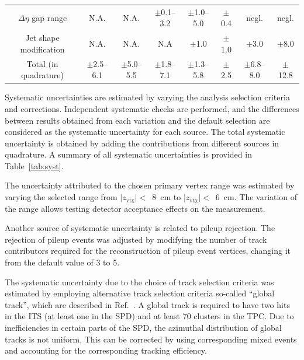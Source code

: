 \begin{table}[h!]
{\begin{tabular}{c|ccc|cccc}
$\Delta\eta$ gap range   	 & N.A.          & N.A.          & $\pm$0.1--3.2 & $\pm$1.0--5.0 & $\pm$0.4 & negl. & negl. \\ 
Jet shape modification   	 & N.A.          & N.A.          & N.A &  $\pm$1.0& $\pm$1.0 & $\pm$3.0 & $\pm$8.0 \\ 
\hline 
Total (in quadrature)& $\pm$2.5--6.1 & $\pm$5.0--5.5 & $\pm$1.8--7.1 & $\pm$1.3--5.8 & $\pm$2.5 & $\pm$6.8--8.0 & $\pm$12.8 \\ 
\hline 
\end{tabular}
}
\end{table}

Systematic uncertainties are estimated by varying the analysis selection criteria and corrections. Independent systematic checks are performed, and the differences between results obtained from each variation and the default selection are considered as the systematic uncertainty for each source. The total systematic uncertainty is obtained by adding the contributions from different sources in quadrature. A summary of all systematic uncertainties is provided in Table~\ref{tab:syst}. 

The uncertainty attributed to the chosen primary vertex range was estimated by varying the selected range from $|z_\mathrm{vtx}|<$~8~cm to $|z_\mathrm{vtx}|<$~6~cm. The variation of the range allows testing detector acceptance effects on the measurement.  

Another source of systematic uncertainty is related to pileup rejection. The rejection of pileup events was adjusted by modifying the number of track contributors required for the reconstruction of pileup event vertices, changing it from the default value of 3 to 5.

The systematic uncertainty due to the choice of track selection criteria was estimated by employing alternative track selection criteria so-called “global track”, which are described in Ref.~\cite{ALICE:2021ptz}. A global track is required to have two hits in the ITS (at least one in the SPD) and at least 70 clusters in the TPC. Due to inefficiencies in certain parts of the SPD, the azimuthal distribution of global tracks is not uniform. This can be corrected by using corresponding mixed events and accounting for the corresponding tracking efficiency.


